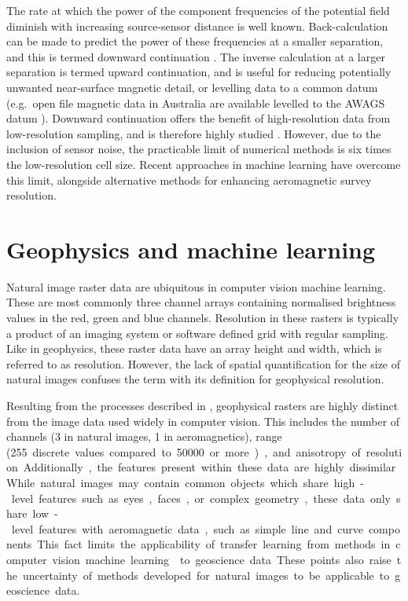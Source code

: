 The rate at which the power of the component frequencies of the potential field diminish with increasing source-sensor distance is well known.
Back-calculation can be made to predict the power of these frequencies at a smaller separation, and this is termed downward continuation \textcite{bullardDeterminationMassesNecessary1948,blakelyPotentialTheoryGravity1996}.
The inverse calculation at a larger separation is termed upward continuation, and is useful for reducing potentially unwanted near-surface magnetic detail, or levelling data to a common datum (e.g.\ open file magnetic data in Australia are available levelled to the AWAGS datum \parencite{mintyAirborneGeophysicalMapping2011}).
Downward continuation offers the benefit of high-resolution data from low-resolution sampling, and is therefore highly studied \parencite{zuoDownwardContinuationTransformation2020,fediStableDownwardContinuation2002,zhangNumericalSolutionsMeanValue2018,guoPotentialFieldContinuation2020,gangImprovedStableDownward2018,pilkingtonPotentialFieldContinuation2017}.
However, due to the inclusion of sensor noise, the practicable limit of numerical methods is six times the low-resolution cell size.
Recent approaches in machine learning have overcome this limit, alongside alternative methods for enhancing aeromagnetic survey resolution.

\section{Geophysics and machine learning}
\label{sec:introdata}
Natural image raster data are ubiquitous in computer vision machine learning.
These are most commonly three channel arrays containing normalised brightness values in the red, green and blue channels.
Resolution in these rasters is typically a product of an imaging system or software defined grid with regular sampling.
Like in geophysics, these raster data have an array height and width, which is referred to as resolution.
However, the lack of spatial quantification for the size of natural images confuses the term with its definition for geophysical resolution.

Resulting from the processes described in , geophysical rasters are highly distinct from the image data used widely in computer vision.
This includes the number of channels (3 in natural images, 1 in aeromagnetics), range (\qty{255} discrete values compared to \qty{50000} or more), and anisotropy of resolution.
Additionally, the features present within these data are highly dissimilar.
While natural images may contain common objects which share high-level features such as eyes, faces, or complex geometry, these data only share low-level features with aeromagnetic data, such as simple line and curve components.
This fact limits the applicability of transfer learning from methods in computer vision machine learning \parencite{tanSurveyDeepTransfer2018} to geoscience data.
These points also raise the uncertainty of methods developed for natural images to be  applicable to geoscience data.

